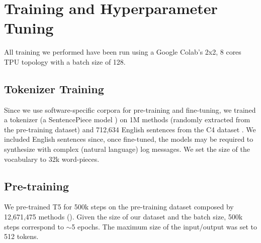 \section{Training and Hyperparameter Tuning} \label{sec:training}
All training we performed have been run using a Google Colab's 2x2, 8 cores TPU topology with a batch size of 128.

\subsection{Tokenizer Training}
Since we use software-specific corpora for pre-training and fine-tuning, we trained a tokenizer (\ie a SentencePiece model \cite{kudo2018sentencepiece}) on 1M \java methods (randomly extracted from the pre-training dataset) and 712,634 English sentences from the C4 dataset \cite{raffel2019exploring}. We included English sentences since, once fine-tuned, the models may be required to synthesize with complex (natural language) log messages. We set the size of the vocabulary to 32k word-pieces.

\subsection{Pre-training}
We pre-trained T5 for 500k steps on the pre-training dataset composed by 12,671,475 \java methods (). Given the size of our dataset and the batch size, 500k steps correspond to $\sim$5 epochs. The maximum size of the input/output was set to 512 tokens.

